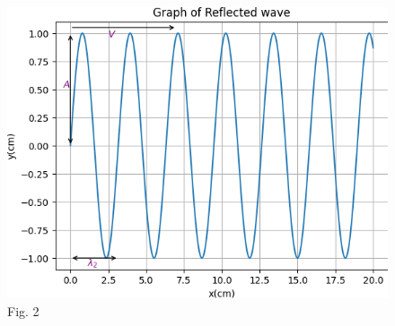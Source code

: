 \documentclass[journal,12pt,onecolumn]{IEEEtran}
\theoremstyle{remark}
\begin{document}
\begin{figure}[h]
    
    \includegraphics[width=120mm]{figs/fig2.png}\\
     \centering
    {Fig. 2}
\end{figure}
\end{document}

